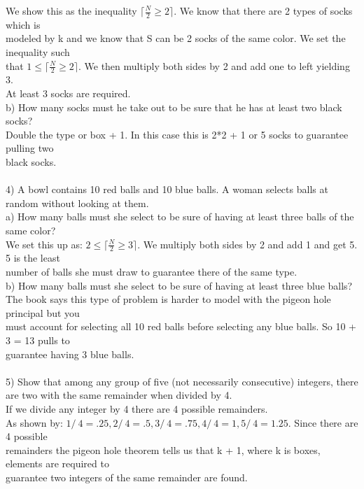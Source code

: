 \documentclass{article}
\begin{document}
\begin{flushleft}
\setlength\parindent{48pt} We show this as the inequality $\lceil \frac{N}{2} \geq 2 \rceil$.  We know that there are 2 types of socks which is \\modeled by k and we know that S can be 2 socks of the same color.  We set the inequality such \\that $1 \leq \lceil \frac{N}{2} \geq 2 \rceil$.  We then multiply both sides by 2 and add one to left yielding 3.  \\At least 3 socks are required.  \\
\setlength\parindent{24pt}b) How many socks must he take out to be sure that he has at least two black socks? \\
\setlength\parindent{48pt} Double the type or box + 1.  In this case this is 2*2 + 1 or 5 socks to guarantee pulling two \\black socks. \\
~\\
\setlength\parindent{0pt}4) A bowl contains 10 red balls and 10 blue balls.  A woman selects balls at random without looking at them. \\
\setlength\parindent{24pt}a) How many balls must she select to be sure of having at least three balls of the same color? \\
\setlength\parindent{48pt} We set this up as: $2 \leq \lceil \frac{N}{2} \geq 3 \rceil$.  We multiply both sides by 2 and add 1 and get 5.  5 is the least \\number of balls she must draw to guarantee there of the same type. \\
\setlength\parindent{24pt}b) How many balls must she select to be sure of having at least three blue balls? \\
\setlength\parindent{48pt} The book says this type of problem is harder to model with the pigeon hole principal but you \\must account for selecting all 10 red balls before selecting any blue balls.  So 10 + 3 = 13 pulls to \\guarantee having 3 blue balls. \\
~\\
\setlength\parindent{0pt}5) Show that among any group of five (not necessarily consecutive) integers, there are two with the same remainder when divided by 4. \\
\setlength\parindent{24pt}If we divide any integer by 4 there are 4 possible remainders.  \\As shown by: $1 /\ 4 = .25, 2 /\ 4 = .5, 3 /\ 4 = .75, 4 /\ 4 = 1, 5 /\ 4 = 1.25.$  Since there are 4 possible \\remainders the pigeon hole theorem tells us that k + 1, where k is boxes, elements are required to \\guarantee two integers of the same remainder are found.  \\

\end{flushleft}
\end{document}
